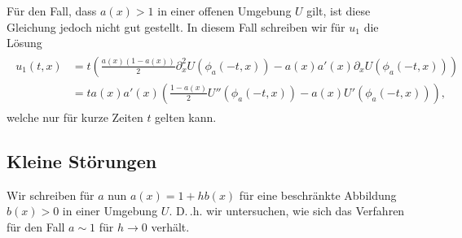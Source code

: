 Für den Fall, dass $a(x) > 1$ in einer offenen Umgebung $U$ gilt, ist diese Gleichung jedoch nicht gut gestellt.
In diesem Fall schreiben wir für $u_1$ die Lösung
\begin{align}
\begin{split}
u_1(t,x) &= t \left( \frac{a(x)(1 - a(x) )}{2} \partial^2_x U( \phi_a(-t, x) ) - a(x) a'(x)  \partial_x U( \phi_a(-t, x) )\right)\\
&= t a(x) a'(x) \left( \frac{1 - a(x) }{2} U''( \phi_a(-t, x) ) - a(x)  U'( \phi_a(-t, x) )\right),
\end{split}
\end{align}
welche nur für kurze Zeiten $t$ gelten kann.

\subsection*{Kleine Störungen}

Wir schreiben für $a$ nun $a(x) = 1 + h b(x)$ für eine beschränkte Abbildung $b(x) > 0$ in einer Umgebung $U$.
D.\,.h. wir untersuchen, wie sich das Verfahren für den Fall $a  \sim 1$ für $h \to 0$ verhält.

